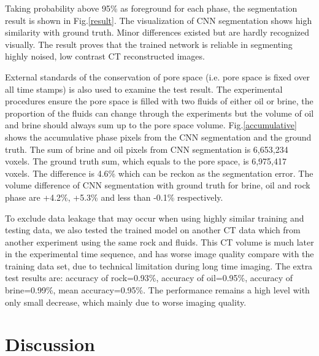 \documentclass[draft,linenumbers]{agujournal2018}
\begin{document}
Taking probability above 95\% as foreground for each phase, the segmentation result is shown in Fig.\ref{result}. The visualization of CNN segmentation shows high similarity with ground truth. Minor differences existed but are hardly recognized visually. The result proves that the trained network is reliable in segmenting highly noised, low contrast \textmu CT reconstructed images.

External standards of the conservation of pore space (i.e. pore space is fixed over all time stamps) is also used to examine the test result. The experimental procedures ensure the pore space is filled with two fluids of either oil or brine, the proportion of the fluids can change through the experiments but the volume of oil and brine should always sum up to the pore space volume. Fig.\ref{accumulative} shows the accumulative phase pixels from the CNN segmentation and the ground truth. The sum of brine and oil pixels from CNN segmentation is 6,653,234 voxels. The ground truth sum, which equals to the pore space, is 6,975,417 voxels. The difference is 4.6\% which can be reckon as the segmentation error. The volume difference of CNN segmentation with ground truth for brine, oil and rock phase are +4.2\%, +5.3\% and less than -0.1\% respectively. 

To exclude data leakage that may occur when using highly similar training and testing data, we also tested the trained model on another \textmu CT data which from another experiment using the same rock and fluids. This \textmu CT volume is much later in the experimental time sequence, and has worse image quality compare with the training data set, due to technical limitation during long time imaging. The extra test results are: accuracy of rock=0.93\%,
accuracy of oil=0.95\%, accuracy of brine=0.99\%, mean accuracy=0.95\%. The performance remains a high level with only small decrease, which mainly due to worse imaging quality.

\section{Discussion}
\end{document}
